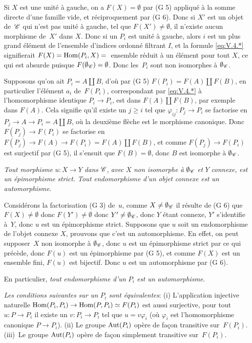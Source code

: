 \begin{enumerateb}
Si $X$ est une unit\'e \`a gauche, on a $F(X)=\emptyset$ par (G 5)
appliqu\'e \`a la somme directe d'une famille vide, et
r\'eciproquement par (G 6). Donc si $X'$ est un objet de~$\cal{C}$
qui n'est pas unit\'e \`a gauche, \ie tel que $F(X') \neq
\emptyset$, il n'existe aucun morphisme de~$X'$ dans $X$. Donc si un
$P_i$ est unit\'e \`a gauche, alors $i$ est un plus grand
\'el\'ement de l'ensemble d'indices ordonn\'e filtrant $I$, et
la formule \eqref{eq:V.4.*} signifierait $F(X)=\operatorname{Hom}(P_i,X)={}$ ensemble
r\'eduit \`a un \'el\'ement pour tout $X$, ce qui est absurde
puisque $F(\emptyset_{\cal{C}})=\emptyset$. Donc les~$P_i$ sont non
isomorphes \`a $\emptyset_{\cal{C}}$.

Supposons qu'on ait $P_i=A \amalg B$, d'o\`u par (G 5)
$F(P_i)=F(A) \amalg F(B)$, en particulier l'\'el\'ement $a_i$
de~$F(P_i)$, correspondant par \eqref{eq:V.4.*} \`a
l'homomorphisme identique $P_i \to P_i$, est dans $F(A) \amalg
F(B)$, par exemple dans $F(A)$. Cela signifie qu'il existe un $j
\geq i$ tel que $\varphi_{ij} \colon P_j \to P_i$ se factorise en
$P_j \to A \to P_i=A \amalg B$, o\`u la deuxi\`eme fl\`eche
est le morphisme canonique. Donc $F(P_j) \to F(P_i)$ se factorise
en $F(P_j) \to F(A) \to F(P_i)=F(A) \amalg F(B)$, et comme $F(P_j)
\to F(P_i)$ est surjectif par (G 5), il s'ensuit que
$F(B)=\emptyset$, donc $B$ est isomorphe \`a $\emptyset_{\cal{C}}$.

\item[e)]
\emph{Tout morphisme} $u \colon X \to Y$ \emph{dans} $\cal{C}$,
\emph{avec} $X$ \emph{non isomorphe à} $\emptyset_{\cal{C}}$
\emph{et} $Y$ \emph{connexe, est un épimorphisme strict. Tout
endomorphisme d'un objet connexe est un automorphisme}.

Consid\'erons la factorisation (G 3) de~$u$, comme $X \neq
\emptyset_{\cal{C}}$ il r\'esulte de (G 6) que $F(X) \neq \emptyset$ donc
$F(Y') \neq \emptyset$ donc $Y' \neq \emptyset_{\cal{C}}$, donc $Y$
\'etant connexe, $Y'$ s'identifie \`a~$Y$, donc $u$ est un
\'epimorphisme strict. Supposons que $u$ soit un endomorphisme de
l'objet connexe $X$, prouvons que c'est un automorphisme. En effet, on
peut supposer~$X$ non isomorphe \`a $\emptyset_{\cal{C}}$, donc $u$ est
un \'epimorphisme strict par ce qui pr\'ec\`ede, donc $F(u)$ est
un \'epimorphisme par (G 5), et comme $F(X)$ est un ensemble fini,
$F(u)$ est bijectif. Donc $u$ est un automorphisme par (G 6).

En particulier, \emph{tout endomorphisme d'un} $P_i$ \emph{est un
automorphisme}.

\item[f)] \emph{Les conditions suivantes sur un} $P_i$ \emph{sont
équivalentes}: (i) L'application injective naturelle
$\Hom(P_i,P_i) \to \Hom(P,P_i) \simeq F(P_i)$ est aussi surjective,
\ie pour tout $u \colon P \to P_i$ il existe un $v \colon P_i \to
P_i$ tel que $u=v\varphi_i$ (o\`u $\varphi_i$ est l'homomorphisme
canonique $P \to P_i$). (ii) Le groupe $\operatorname{Aut}(P_i)$ op\`ere de fa\c con transitive sur~$F(P_i)$. (iii)~Le groupe $\operatorname{Aut}(P_i)$ op\`ere de
fa\c con simplement transitive sur~$F(P_i)$.


\end{enumerateb}
